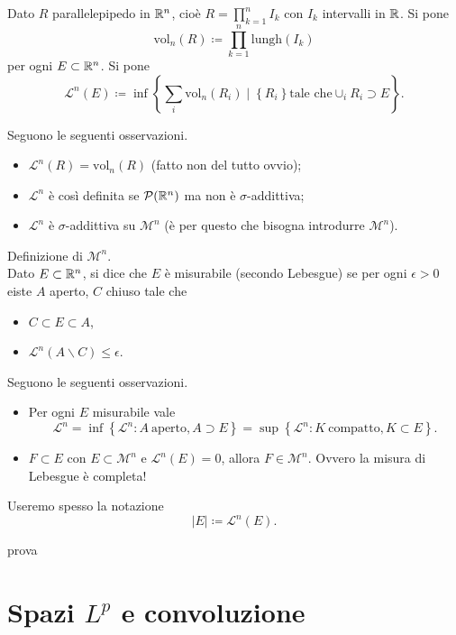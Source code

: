 \documentclass[a4paper, 11pt]{report}
\begin{document}
Dato $R$ parallelepipedo in $\mathbb R^n$, cioè $R = \prod_{k=1}^{n} I_k $ con $I_k$ intervalli in $\mathbb R$.
Si pone
\[
\mathrm{vol}_n (R) \coloneqq \prod_{k=1}^{n}  \mathrm{lungh} (I_k)
\] 
per ogni $E \subset \mathbb R^n$. Si pone
\[
\mathcal{L}^n(E) \coloneqq \inf \left\{ \sum_{i}^{} \mathrm{vol}_n (R_i) \mid \left\{ R_i \right\} \text{tale che} \cup_i R_i \supset E  \right\}.
\] 
\begin{osservazione}
Seguono le seguenti osservazioni.
\begin{itemize}
\item $\mathcal{L}^n(R) = \mathrm{vol}_n (R)$ (fatto non del tutto ovvio);
\item $\mathcal{L}^n$ è così definita se $\mathcal{P}(\mathbb R^n)$ ma non è $\sigma$-addittiva;
\item $\mathcal{L}^n$ è $\sigma$-addittiva su $\mathcal{M}^n$ (è per questo che bisogna introdurre $\mathcal{M}^n$).
\end{itemize}
\end{osservazione}
%
Definizione di $\mathcal{M}^n$. \\
Dato $E \subset \mathbb R^n$, si dice che $E$ è misurabile (secondo Lebesgue) se per ogni $\epsilon > 0$ eiste $A$ aperto, $C$ chiuso tale che
\begin{itemize}
\item $C \subset E \subset A$,
\item $\mathcal{L}^n (A \smallsetminus C) \leq \epsilon$.
\end{itemize}
%
\begin{osservazione}
Seguono le seguenti osservazioni.
\begin{itemize}
\item Per ogni $E$ misurabile vale
\[
\mathcal{L}^n = \inf \left\{ \mathcal{L}^n \colon A \ \text{aperto}, A \supset E \right\} = \sup \left\{ \mathcal{L}^n \colon K \ \text{compatto}, K \subset E \right\}.
\] 
\item $F \subset E$ con $E \subset \mathcal{M}^n$ e $\mathcal{L}^n(E) = 0$, allora $F \in \mathcal{M}^n$. Ovvero la misura di Lebesgue è completa!
\end{itemize}
%
Useremo spesso la notazione
\[
\left| E \right| \coloneqq \mathcal{L}^n (E).
\] 
\end{osservazione}

prova

\chapter{Spazi $L^p$ e convoluzione}
\end{document}
